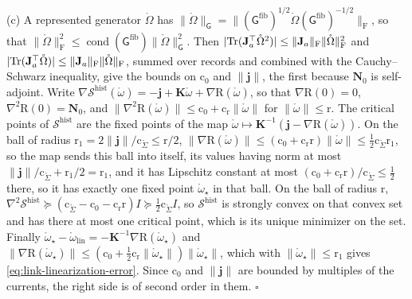 (c) A represented generator $\mathring\Omega$ has
$\lVert\mathring\Omega\rVert_{\mathsf G}=\lVert(\mathsf G^{\mathrm{fib}})^{1/2}\mathring\Omega(\mathsf G^{\mathrm{fib}})^{-1/2}\rVert_{\mathrm F}$,
so that
$\lVert\mathring\Omega\rVert_{\mathrm F}^2\leq\operatorname{cond}(\mathsf G^{\mathrm{fib}})\lVert\mathring\Omega\rVert_{\mathsf G}^2$.
Then $\lvert\operatorname{Tr}(\mathbf J_a^\top\mathring\Omega^2)\rvert\leq\lVert\mathbf J_a\rVert_{\mathrm F}\lVert\mathring\Omega\rVert_{\mathrm F}^2$
and $\lvert\operatorname{Tr}(\mathbf J_a^\top\mathring\Omega)\rvert\leq\lVert\mathbf J_a\rVert_{\mathrm F}\lVert\mathring\Omega\rVert_{\mathrm F}$,
summed over records and combined with the Cauchy--Schwarz inequality, give the bounds on
$\mathrm c_0$ and $\lVert\mathbf j\rVert$, the first because $\mathbf N_0$ is self-adjoint. Write
$\nabla\mathscr S^{\mathrm{hist}}(\mathring\omega)=-\mathbf j+\mathbf K\mathring\omega+\nabla\mathrm R(\mathring\omega)$, so that
$\nabla\mathrm R(0)=0$, $\nabla^2\mathrm R(0)=\mathbf N_0$, and
$\lVert\nabla^2\mathrm R(\mathring\omega)\rVert\leq\mathrm c_0+\mathrm c_{\mathrm r}\lVert\mathring\omega\rVert$ for
$\lVert\mathring\omega\rVert\leq\mathrm r$. The critical points of $\mathscr S^{\mathrm{hist}}$ are the fixed points of
the map $\mathring\omega\mapsto\mathbf K^{-1}(\mathbf j-\nabla\mathrm R(\mathring\omega))$. On the ball of radius
$\mathrm r_1=2\lVert\mathbf j\rVert/\mathrm c_{\mathring\Sigma}\leq\mathrm r/2$,
$\lVert\nabla\mathrm R(\mathring\omega)\rVert\leq(\mathrm c_0+\mathrm c_{\mathrm r}\mathrm r)\lVert\mathring\omega\rVert\leq\tfrac12\mathrm c_{\mathring\Sigma}\mathrm r_1$,
so the map sends this ball into itself, its values having norm at most
$\lVert\mathbf j\rVert/\mathrm c_{\mathring\Sigma}+\mathrm r_1/2=\mathrm r_1$, and it has Lipschitz constant at
most $(\mathrm c_0+\mathrm c_{\mathrm r}\mathrm r)/\mathrm c_{\mathring\Sigma}\leq\tfrac12$ there, so it has exactly
one fixed point $\mathring\omega_\star$ in that ball. On the ball of radius $\mathrm r$,
$\nabla^2\mathscr S^{\mathrm{hist}}\succeq(\mathrm c_{\mathring\Sigma}-\mathrm c_0-\mathrm c_{\mathrm r}\mathrm r)I\succeq\tfrac12\mathrm c_{\mathring\Sigma}I$,
so $\mathscr S^{\mathrm{hist}}$ is strongly convex on that convex set and has there at most one critical point, which is
its unique minimizer on the set. Finally
$\mathring\omega_\star-\mathring\omega_{\mathrm{lin}}=-\mathbf K^{-1}\nabla\mathrm R(\mathring\omega_\star)$ and
$\lVert\nabla\mathrm R(\mathring\omega_\star)\rVert\leq(\mathrm c_0+\tfrac12\mathrm c_{\mathrm r}\lVert\mathring\omega_\star\rVert)\lVert\mathring\omega_\star\rVert$,
which with $\lVert\mathring\omega_\star\rVert\leq\mathrm r_1$ gives \eqref{eq:link-linearization-error}. Since
$\mathrm c_0$ and $\lVert\mathbf j\rVert$ are bounded by multiples of the currents, the right side is
of second order in them. \hfill$\square$
